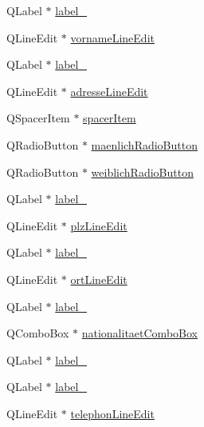 \begin{CompactItemize}
\item 
QLabel $\ast$ \hyperlink{class_ui___r_f_i_d_input_dialog_class_ed9edc4c45c1e2d056d430cdc4afd4d1}{label\_}
\item 
QLineEdit $\ast$ \hyperlink{class_ui___r_f_i_d_input_dialog_class_ff3670254a5ae940c6045463bae158ab}{vornameLineEdit}
\item 
QLabel $\ast$ \hyperlink{class_ui___r_f_i_d_input_dialog_class_c09be5c1ca2a14aa0e6770aeaebb2f81}{label\_}
\item 
QLineEdit $\ast$ \hyperlink{class_ui___r_f_i_d_input_dialog_class_fcbdd99c7ed313b95eb96f49256ae8fd}{adresseLineEdit}
\item 
QSpacerItem $\ast$ \hyperlink{class_ui___r_f_i_d_input_dialog_class_7ec752b8c4dca22cfac4fbfe3be35923}{spacerItem}
\item 
QRadioButton $\ast$ \hyperlink{class_ui___r_f_i_d_input_dialog_class_522ea6b44f4494a26cfd4920252ff99f}{maenlichRadioButton}
\item 
QRadioButton $\ast$ \hyperlink{class_ui___r_f_i_d_input_dialog_class_5e6931622decd2011e21bb494a941dba}{weiblichRadioButton}
\item 
QLabel $\ast$ \hyperlink{class_ui___r_f_i_d_input_dialog_class_96cd29530cfc6610bb23119b32edf886}{label\_}
\item 
QLineEdit $\ast$ \hyperlink{class_ui___r_f_i_d_input_dialog_class_20e8b6974519d4510cf733992d8c2027}{plzLineEdit}
\item 
QLabel $\ast$ \hyperlink{class_ui___r_f_i_d_input_dialog_class_0b699227f3a20a7c2c4eaf330e2ba828}{label\_}
\item 
QLineEdit $\ast$ \hyperlink{class_ui___r_f_i_d_input_dialog_class_8524d17700c18aadaf06c968611bb835}{ortLineEdit}
\item 
QLabel $\ast$ \hyperlink{class_ui___r_f_i_d_input_dialog_class_da00ac3d742ebc8b0ac85b337b1f497f}{label\_}
\item 
QComboBox $\ast$ \hyperlink{class_ui___r_f_i_d_input_dialog_class_178fa80ddddaf49ec9096cb08cc76494}{nationalitaetComboBox}
\item 
QLabel $\ast$ \hyperlink{class_ui___r_f_i_d_input_dialog_class_18ee17862fad2848d73792eb1ee20cc5}{label\_}
\item 
QLabel $\ast$ \hyperlink{class_ui___r_f_i_d_input_dialog_class_a3cb61f7b53e090f1bb9750ec9774d8e}{label\_}
\item 
QLineEdit $\ast$ \hyperlink{class_ui___r_f_i_d_input_dialog_class_db31c8901b94fac9a408a313e419c47e}{telephonLineEdit}
\item 

\end{CompactItemize}
